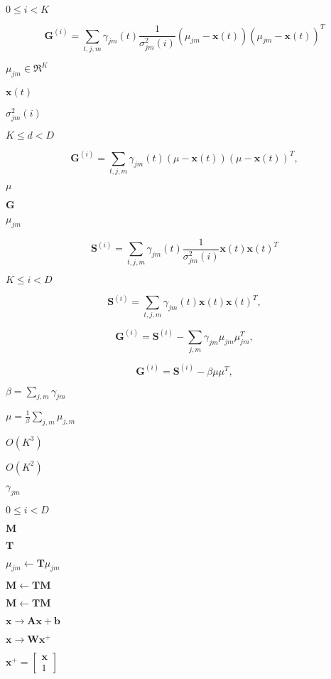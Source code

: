 \documentclass{article}
\begin{document}
$0 \leq i < K$
\pagebreak

\[ \mathbf{G}^{(i)} = \sum_{t,j,m} \gamma_{jm}(t) \frac{1}{ \sigma^2_{jm}(i) } (\mu_{jm} - \mathbf{x}(t)) (\mu_{jm} - \mathbf{x}(t))^T \]
\pagebreak

$\mu_{jm} \in \Re^{K}$
\pagebreak

$\mathbf{x}(t)$
\pagebreak

$\sigma^2_{jm}(i)$
\pagebreak

$ K \leq d < D$
\pagebreak

\[ \mathbf{G}^{(i)} = \sum_{t,j,m} \gamma_{jm}(t) (\mu - \mathbf{x}(t)) (\mu - \mathbf{x}(t))^T , \]
\pagebreak

$\mu$
\pagebreak

$\mathbf{G}$
\pagebreak

$\mu_{jm}$
\pagebreak

\[ \mathbf{S}^{(i)} = \sum_{t,j,m} \gamma_{jm}(t) \frac{1}{ \sigma^2_{jm}(i) } \mathbf{x}(t) \mathbf{x}(t)^T \]
\pagebreak

$K \leq i < D$
\pagebreak

\[ \mathbf{S}^{(i)} = \sum_{t,j,m} \gamma_{jm}(t) \mathbf{x}(t) \mathbf{x}(t)^T , \]
\pagebreak

\[ \mathbf{G}^{(i)} = \mathbf{S}^{(i)} - \sum_{j,m} \gamma_{jm} \mu_{jm} \mu_{jm}^T , \]
\pagebreak

\[ \mathbf{G}^{(i)} = \mathbf{S}^{(i)} - \beta \mu \mu^T, \]
\pagebreak

$ \beta = \sum_{j,m} \gamma_{jm} $
\pagebreak

$\mu = \frac{1}{\beta} \sum_{j,m} \mu_{j,m}$
\pagebreak

$ O(K^3) $
\pagebreak

$O(K^2)$
\pagebreak

$\gamma_{jm}$
\pagebreak

$ 0 \leq i < D $
\pagebreak

$\mathbf{M}$
\pagebreak

$\mathbf{T}$
\pagebreak

$ \mu_{jm} \leftarrow \mathbf{T} \mu_{jm} $
\pagebreak

$ \mathbf{M} \leftarrow \mathbf{T} \mathbf{M} $
\pagebreak

$\mathbf{M} \leftarrow \mathbf{T} \mathbf{M} $
\pagebreak

$ \mathbf{x} \rightarrow \mathbf{A} \mathbf{x} + \mathbf{b} $
\pagebreak

$ \mathbf{x} \rightarrow \mathbf{W} \mathbf{x}^+ $
\pagebreak

$\mathbf{x}^+ = \left[\begin{array}{c} \mathbf{x} \\ 1 \end{array} \right]$
\pagebreak
\end{document}
